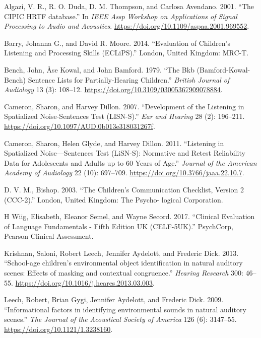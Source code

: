 \documentclass[a4paper,nobind]{templates/ociamthesis}
\begin{document}
\hypertarget{refs}{}
\begin{cslreferences}
\leavevmode\hypertarget{ref-Algazi2001}{}%
Algazi, V. R., R. O. Duda, D. M. Thompson, and Carlosa Avendano. 2001.
``The CIPIC HRTF database.'' In \emph{IEEE Assp Workshop on Applications
of Signal Processing to Audio and Acoustics}.
\url{https://doi.org/10.1109/aspaa.2001.969552}.

\leavevmode\hypertarget{ref-Barry2014}{}%
Barry, Johanna G., and David R. Moore. 2014. ``Evaluation of Children's
Listening and Processing Skills (ECLiPS).'' London, United Kingdom:
MRC-T.

\leavevmode\hypertarget{ref-Bench1979}{}%
Bench, John, Åse Kowal, and John Bamford. 1979. ``The Bkb
(Bamford-Kowal-Bench) Sentence Lists for Partially-Hearing Children.''
\emph{British Journal of Audiology} 13 (3): 108--12.
\url{https://doi.org/10.3109/03005367909078884}.

\leavevmode\hypertarget{ref-Cameron2007}{}%
Cameron, Sharon, and Harvey Dillon. 2007. ``Development of the Listening
in Spatialized Noise-Sentences Test (LISN-S).'' \emph{Ear and Hearing}
28 (2): 196--211. \url{https://doi.org/10.1097/AUD.0b013e318031267f}.

\leavevmode\hypertarget{ref-Cameron2011}{}%
Cameron, Sharon, Helen Glyde, and Harvey Dillon. 2011. ``Listening in
Spatialized Noise---Sentences Test (LiSN-S): Normative and Retest
Reliability Data for Adolescents and Adults up to 60 Years of Age.''
\emph{Journal of the American Academy of Audiology} 22 (10): 697--709.
\url{https://doi.org/10.3766/jaaa.22.10.7}.

\leavevmode\hypertarget{ref-D.V.M.2003}{}%
D. V. M., Bishop. 2003. ``The Children's Communication Checklist,
Version 2 (CCC-2).'' London, United Kingdom: The Psycho- logical
Corporation.

\leavevmode\hypertarget{ref-HWiig2017}{}%
H Wiig, Elisabeth, Eleanor Semel, and Wayne Secord. 2017. ``Clinical
Evaluation of Language Fundamentals - Fifth Edition UK (CELF-5UK).''
PsychCorp, Pearson Clinical Assessment.

\leavevmode\hypertarget{ref-Krishnan2013}{}%
Krishnan, Saloni, Robert Leech, Jennifer Aydelott, and Frederic Dick.
2013. ``School-age children's environmental object identification in
natural auditory scenes: Effects of masking and contextual congruence.''
\emph{Hearing Research} 300: 46--55.
\url{https://doi.org/10.1016/j.heares.2013.03.003}.

\leavevmode\hypertarget{ref-Leech2009}{}%
Leech, Robert, Brian Gygi, Jennifer Aydelott, and Frederic Dick. 2009.
``Informational factors in identifying environmental sounds in natural
auditory scenes.'' \emph{The Journal of the Acoustical Society of
America} 126 (6): 3147--55. \url{https://doi.org/10.1121/1.3238160}.


\end{cslreferences}
\end{document}
